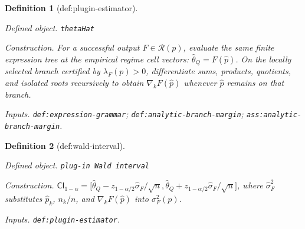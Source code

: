 \documentclass{article}
\newtheorem{definition}{Definition}
\begin{document}
\begin{definition}[def:plugin-estimator]\label{def:plugin-estimator}
\par\smallskip\noindent\emph{Defined object.} \texttt{thetaHat}
\par\smallskip\noindent\emph{Construction.} For a successful output \(F\in\mathcal R(p)\), evaluate the same finite expression tree at the empirical regime cell vectors: \(\widehat\theta_Q=F(\widehat p)\). On the locally selected branch certified by \(\lambda_F(p)>0\), differentiate sums, products, quotients, and isolated roots recursively to obtain \(\nabla_kF(\widehat p)\) whenever \(\widehat p\) remains on that branch.
\par\smallskip\noindent\emph{Inputs.} \texttt{def:\allowbreak{}expression-\allowbreak{}grammar}; \texttt{def:\allowbreak{}analytic-\allowbreak{}branch-\allowbreak{}margin}; \texttt{ass:\allowbreak{}analytic-\allowbreak{}branch-\allowbreak{}margin}.
\end{definition}

\begin{definition}[def:wald-interval]\label{def:wald-interval}
\par\smallskip\noindent\emph{Defined object.} \texttt{plug-\allowbreak{}in Wald interval}
\par\smallskip\noindent\emph{Construction.} \(\mathsf{CI}_{1-\alpha}=\bigl[\widehat\theta_Q-z_{1-\alpha/2}\widehat\sigma_F/\sqrt n,\widehat\theta_Q+z_{1-\alpha/2}\widehat\sigma_F/\sqrt n\bigr]\), where \(\widehat\sigma_F^2\) substitutes \(\widehat p_k\), \(n_k/n\), and \(\nabla_kF(\widehat p)\) into \(\sigma_F^2(p)\).
\par\smallskip\noindent\emph{Inputs.} \texttt{def:\allowbreak{}plugin-\allowbreak{}estimator}.
\end{definition}
\end{document}

